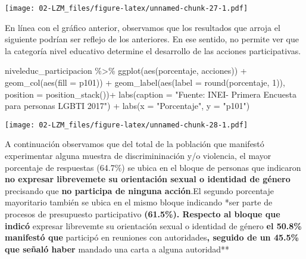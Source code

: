 \documentclass[
]{book}
\newenvironment{Shaded}{\begin{snugshade}}{\end{snugshade}}
\newcommand{\AttributeTok}[1]{\textcolor[rgb]{0.77,0.63,0.00}{#1}}
\newcommand{\DecValTok}[1]{\textcolor[rgb]{0.00,0.00,0.81}{#1}}
\newcommand{\FunctionTok}[1]{\textcolor[rgb]{0.00,0.00,0.00}{#1}}
\newcommand{\NormalTok}[1]{#1}
\newcommand{\SpecialCharTok}[1]{\textcolor[rgb]{0.00,0.00,0.00}{#1}}
\newcommand{\StringTok}[1]{\textcolor[rgb]{0.31,0.60,0.02}{#1}}
\theoremstyle{definition}
\theoremstyle{definition}
\theoremstyle{definition}
\theoremstyle{definition}
\theoremstyle{remark}
\begin{document}
\texttt{[image: 02-LZM\_files/figure-latex/unnamed-chunk-27-1.pdf]}

En línea con el gráfico anterior, observamos que los resultados que arroja el siguiente podrían ser reflejo de los anteriores. En ese sentido, no permite ver que la categoría nivel educativo determine el desarrollo de las acciones participativas.

\begin{Shaded}
\begin{Highlighting}[]
\NormalTok{niveleduc\_participacion }\SpecialCharTok{\%\textgreater{}\%} 
  \FunctionTok{ggplot}\NormalTok{(}\FunctionTok{aes}\NormalTok{(porcentaje, acciones)) }\SpecialCharTok{+}
  \FunctionTok{geom\_col}\NormalTok{(}\FunctionTok{aes}\NormalTok{(}\AttributeTok{fill =}\NormalTok{ p101)) }\SpecialCharTok{+}
  \FunctionTok{geom\_label}\NormalTok{(}\FunctionTok{aes}\NormalTok{(}\AttributeTok{label =} \FunctionTok{round}\NormalTok{(porcentaje, }\DecValTok{1}\NormalTok{)), }\AttributeTok{position =} \FunctionTok{position\_stack}\NormalTok{())}\SpecialCharTok{+}
  \FunctionTok{labs}\NormalTok{(}\AttributeTok{caption =} \StringTok{"Fuente: INEI{-} Primera Encuesta para personas LGBTI 2017"}\NormalTok{) }\SpecialCharTok{+}
  \FunctionTok{labs}\NormalTok{(}\AttributeTok{x =} \StringTok{"Porcentaje"}\NormalTok{,}
       \AttributeTok{y =} \StringTok{"p101"}\NormalTok{)}
\end{Highlighting}
\end{Shaded}

\texttt{[image: 02-LZM\_files/figure-latex/unnamed-chunk-28-1.pdf]}

A continuación observamos que del total de la población que manifestó experimentar alguna muestra de discrimininación y/o violencia, el mayor porcentaje de respuestas (64.7\%) se ubica en el bloque de personas que indicaron \textbf{no expresar librevemete su orientación sexual o identidad de género} precisando que \textbf{no participa de ninguna acción}.El segundo porcentaje mayoritario también se ubica en el mismo bloque indicando *ser parte de procesos de presupuesto participativo\textbf{ (61.5\%). Respecto al bloque que indicó }expresar librevemte su orientación sexual o identidad de género\textbf{ el 50.8\% manifestó que }participó en reuniones con autoridades\textbf{, seguido de un 45.5\% que señaló haber }mandado una carta a alguna autoridad**
\end{document}
